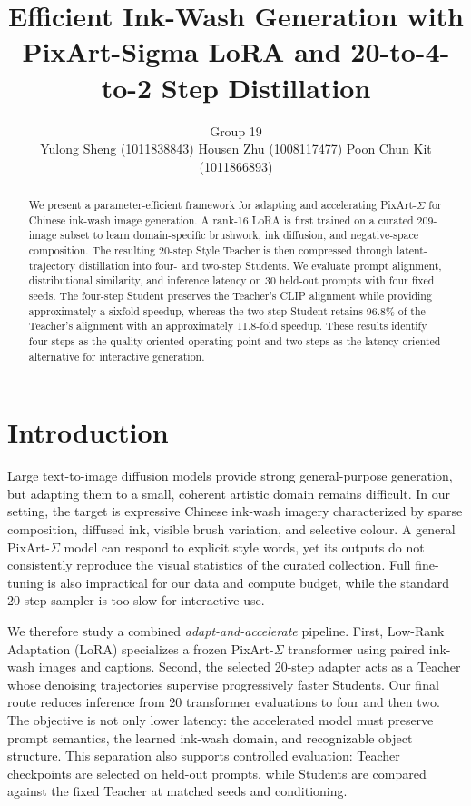 \documentclass{article}
\title{Efficient Ink-Wash Generation with PixArt-Sigma LoRA and 20-to-4-to-2 Step Distillation}
\author{
Group 19\\[4pt]
\small
Yulong Sheng (1011838843)
\quad
Housen Zhu (1008117477)
\quad
Poon Chun Kit (1011866893)
}
\date{}
\begin{document}
\maketitle
\thispagestyle{plain}
\setcounter{page}{1}


\begin{abstract}
We present a parameter-efficient framework for adapting and accelerating
PixArt-$\Sigma$ for Chinese ink-wash image generation. A rank-16 LoRA is first
trained on a curated 209-image subset to learn domain-specific brushwork,
ink diffusion, and negative-space composition. The resulting 20-step Style
Teacher is then compressed through latent-trajectory distillation into four-
and two-step Students. We evaluate prompt alignment, distributional similarity,
and inference latency on 30 held-out prompts with four fixed seeds. The four-step
Student preserves the Teacher's CLIP alignment while providing approximately a
sixfold speedup, whereas the two-step Student retains 96.8\% of the Teacher's
alignment with an approximately 11.8-fold speedup. These results identify four
steps as the quality-oriented operating point and two steps as the
latency-oriented alternative for interactive generation.
\end{abstract}


\section{Introduction}

Large text-to-image diffusion models provide strong general-purpose generation, but adapting them to a small, coherent artistic domain remains difficult. In our setting, the target is expressive Chinese ink-wash imagery characterized by sparse composition, diffused ink, visible brush variation, and selective colour. A general PixArt-$\Sigma$ model can respond to explicit style words, yet its outputs do not consistently reproduce the visual statistics of the curated collection. Full fine-tuning is also impractical for our data and compute budget, while the standard 20-step sampler is too slow for interactive use.

We therefore study a combined \emph{adapt-and-accelerate} pipeline. First, Low-Rank Adaptation (LoRA) specializes a frozen PixArt-$\Sigma$ transformer using paired ink-wash images and captions. Second, the selected 20-step adapter acts as a Teacher whose denoising trajectories supervise progressively faster Students. Our final route reduces inference from 20 transformer evaluations to four and then two. The objective is not only lower latency: the accelerated model must preserve prompt semantics, the learned ink-wash domain, and recognizable object structure. This separation also supports controlled evaluation: Teacher checkpoints are selected on held-out prompts, while Students are compared against the fixed Teacher at matched seeds and conditioning.
\end{document}

